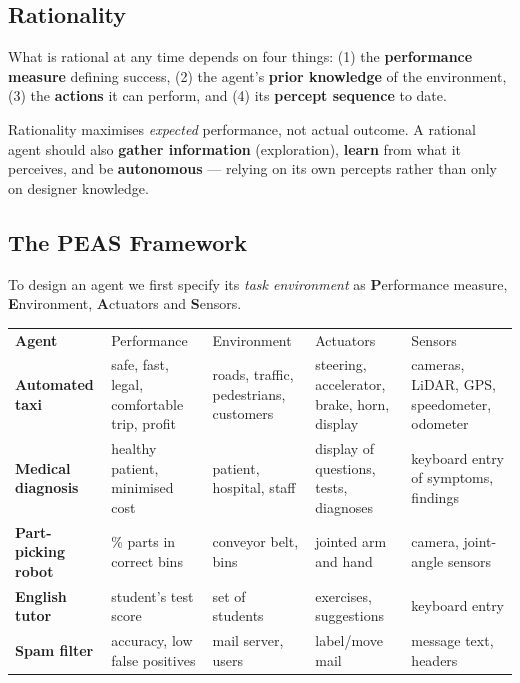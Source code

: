 \subsection{Rationality}
What is rational at any time depends on four things: (1) the \textbf{performance measure} defining success, (2) the agent's \textbf{prior knowledge} of the environment, (3) the \textbf{actions} it can perform, and (4) its \textbf{percept sequence} to date.
\begin{keypoint}
Rationality maximises \emph{expected} performance, not actual outcome. A rational agent should also \textbf{gather information} (exploration), \textbf{learn} from what it perceives, and be \textbf{autonomous} --- relying on its own percepts rather than only on designer knowledge.
\end{keypoint}

\subsection{The PEAS Framework}
To design an agent we first specify its \emph{task environment} as \textbf{P}erformance measure, \textbf{E}nvironment, \textbf{A}ctuators and \textbf{S}ensors.
\begin{center}\small
\begin{tabularx}{\linewidth}{>{\bfseries}p{2.4cm}XXXX}
\rowcolor{navy}\color{white}Agent&\color{gold}Performance&\color{gold}Environment&\color{gold}Actuators&\color{gold}Sensors\\
Automated taxi & safe, fast, legal, comfortable trip, profit & roads, traffic, pedestrians, customers & steering, accelerator, brake, horn, display & cameras, LiDAR, GPS, speedometer, odometer\\
\rowcolor{ivory}Medical diagnosis & healthy patient, minimised cost & patient, hospital, staff & display of questions, tests, diagnoses & keyboard entry of symptoms, findings\\
Part-picking robot & \% parts in correct bins & conveyor belt, bins & jointed arm and hand & camera, joint-angle sensors\\
\rowcolor{ivory}English tutor & student's test score & set of students & exercises, suggestions & keyboard entry\\
Spam filter & accuracy, low false positives & mail server, users & label/move mail & message text, headers\\
\end{tabularx}\end{center}

